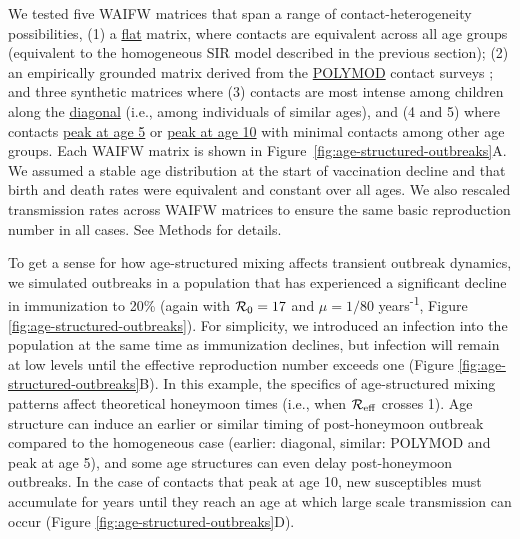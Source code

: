 We tested five WAIFW matrices that span a range of contact-heterogeneity possibilities, (1) a \ul{flat} matrix, where contacts are equivalent across all age groups (equivalent to the homogeneous SIR model described in the previous section); (2) an empirically grounded matrix derived from the \ul{POLYMOD} contact surveys \citep{MossongEtAl2008}; and three synthetic matrices where (3) contacts are most intense among children along the \ul{diagonal} (i.e., among individuals of similar ages), and (4 and 5) where contacts \ul{peak at age 5} or \ul{peak at age 10} with minimal contacts among other age groups. Each WAIFW matrix is shown in Figure~\ref{fig:age-structured-outbreaks}A. We assumed a stable age distribution at the start of vaccination decline and that birth and death rates were equivalent and constant over all ages. We also rescaled transmission rates across WAIFW matrices to ensure the same basic reproduction number in all cases. See Methods for details.

To get a sense for how age-structured mixing affects transient outbreak dynamics, we simulated outbreaks in a population that has experienced a significant decline in immunization to 20\% (again with $\mathcal{R}_{0} = 17$ and $\mu = 1/80$ years\textsuperscript{-1}, Figure \ref{fig:age-structured-outbreaks}). For simplicity, we introduced an infection into the population at the same time as immunization declines, but infection will remain at low levels until the effective reproduction number exceeds one (Figure \ref{fig:age-structured-outbreaks}B). In this example, the specifics of age-structured mixing patterns affect theoretical honeymoon times (i.e., when $\mathcal{R}_{\mathrm{eff}}$ crosses 1). Age structure can induce an earlier or similar timing of post-honeymoon outbreak compared to the homogeneous case (earlier: diagonal, similar: POLYMOD and peak at age 5), and some age structures can even delay post-honeymoon outbreaks. In the case of contacts that peak at age 10, new susceptibles must accumulate for years until they reach an age at which large scale transmission can occur (Figure \ref{fig:age-structured-outbreaks}D).

